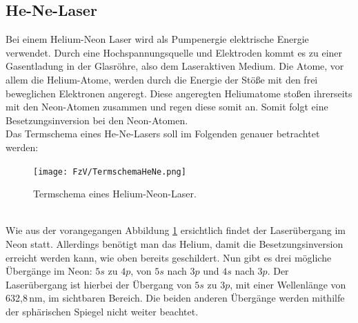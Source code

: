 \subsection{He-Ne-Laser}
Bei einem Helium-Neon Laser wird als Pumpenergie elektrische Energie verwendet. Durch eine 
Hochspannungsquelle und Elektroden kommt es zu einer Gasentladung in der Glasröhre, also dem Laseraktiven Medium. 
Die Atome, vor allem die Helium-Atome, werden durch die Energie der Stöße mit den frei beweglichen Elektronen angeregt.
Diese angeregten Heliumatome stoßen ihrerseits mit den Neon-Atomen zusammen und regen diese somit an. 
Somit folgt eine Besetzungsinversion bei den Neon-Atomen.\\ 
Das Termschema eines He-Ne-Lasers soll im Folgenden genauer betrachtet werden:
\begin{figure}[h]
    \centering
    \texttt{[image: FzV/TermschemaHeNe.png]}
    \caption{Termschema eines Helium-Neon-Laser.}
    \label{fig:Termschema}
\end{figure}\\
Wie aus der vorangegangen Abbildung \ref{fig:Termschema} ersichtlich findet der Laserübergang
im Neon statt. Allerdings benötigt man das Helium, damit die Besetzungsinversion erreicht werden kann, wie oben bereits geschildert. 
Nun gibt es drei mögliche Übergänge im Neon: $5s$ zu $4p$, von $5s$ nach $3p$ und $4s$ nach $3p$. 
Der Laserübergang ist hierbei der Übergang von $5s$ zu $3p$, mit einer Wellenlänge von 632,8\,nm, im sichtbaren Bereich.
Die beiden anderen Übergänge werden mithilfe der sphärischen Spiegel nicht weiter beachtet. \citep[vgl.][]{henelaser}


